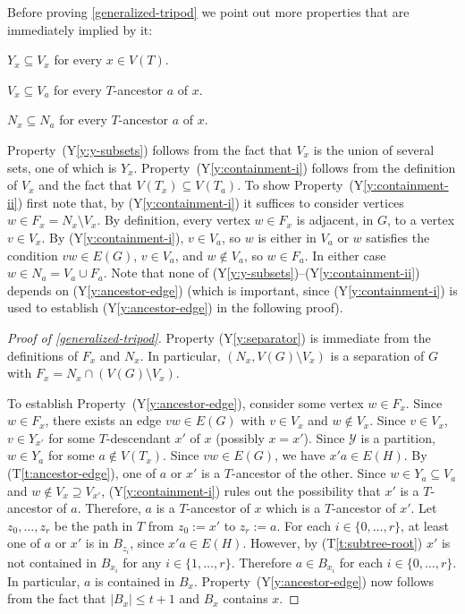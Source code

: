 \documentclass{patmorin}
\newcommand{\tref}[1]{(T\ref{t:#1})}
\newcommand{\ylabel}[1]{\label{y:#1}}
\newcommand{\yref}[1]{(Y\ref{y:#1})}
\renewcommand{\le}{\leqslant}
\begin{document}
Before proving \cref{generalized-tripod} we point out more properties that are immediately implied by it:

\begin{compactenum}[(Y1)]\setcounter{enumi}{2}
  \item\ylabel{y-subsets} $Y_x\subseteq V_x$ for every $x\in V(T)$.
  \item\ylabel{containment-i} $V_x\subseteq V_a$ for every $T$-ancestor $a$ of $x$.
  \item\ylabel{containment-ii}$N_x\subseteq N_a$ for every $T$-ancestor $a$ of $x$.
\end{compactenum}

Property~\yref{y-subsets} follows from the fact that $V_x$ is the union of several sets, one of which is $Y_x$.  Property~\yref{containment-i} follows from the definition of $V_x$ and the fact that $V(T_x)\subseteq V(T_a)$. To show Property~\yref{containment-ii} first note that, by \yref{containment-i} it suffices to consider vertices $w\in F_x=N_x\setminus V_x$. By definition, every vertex $w\in F_x$ is adjacent, in $G$, to a vertex $v\in V_x$.  By \yref{containment-i}, $v\in V_a$, so $w$ is either in $V_a$ or $w$ satisfies the condition $vw\in E(G)$, $v\in V_a$, and $w\not\in V_a$, so $w\in F_a$.  In either case $w\in N_a=V_a\cup F_a$.  Note that none of \yref{y-subsets}--\yref{containment-ii} depends on \yref{ancestor-edge} (which is important, since \yref{containment-i} is used to establish \yref{ancestor-edge} in the following proof).


\begin{proof}[Proof of \cref{generalized-tripod}]
  Property \yref{separator} is immediate from the definitions of $F_x$ and $N_x$.  In particular, $(N_x,V(G)\setminus V_x)$ is a separation of $G$ with $F_x=N_x\cap(V(G)\setminus V_x)$.

  To establish Property~\yref{ancestor-edge}, consider some vertex $w\in F_x$.  Since $w\in F_x$, there exists an edge $vw\in E(G)$ with $v\in V_x$ and $w\not\in V_x$.  Since $v\in V_x$, $v\in Y_{x'}$ for some $T$-descendant $x'$ of $x$ (possibly $x=x'$). Since $\mathcal{Y}$ is a partition, $w\in Y_{a}$ for some $a\not\in V(T_x)$.  Since $vw\in E(G)$, we have $x'a\in E(H)$.  By \tref{ancestor-edge}, one of $a$ or $x'$ is a $T$-ancestor of the other. Since $w\in Y_a\subseteq V_a$ and $w\not\in V_x\supseteq V_{x'}$, \yref{containment-i} rules out the possibility that $x'$ is a $T$-ancestor of $a$. Therefore, $a$ is a $T$-ancestor of $x$ which is a $T$-ancestor of $x'$.  Let $z_0,\ldots,z_r$ be the path in $T$ from $z_0:=x'$ to $z_r:=a$.  For each $i\in\{0,\ldots,r\}$, at least one of $a$ or $x'$ is in $B_{z_i}$, since $x'a\in E(H)$.  However, by \tref{subtree-root} $x'$ is not contained in $B_{x_i}$ for any $i\in\{1,\ldots,r\}$.  Therefore $a\in B_{x_i}$ for each $i\in\{0,\ldots,r\}$.  In particular, $a$ is contained in $B_x$.
  Property~\yref{ancestor-edge} now follows from the fact that $|B_x|\le t+1$ and $B_x$ contains $x$.
\end{proof}
\end{document}
